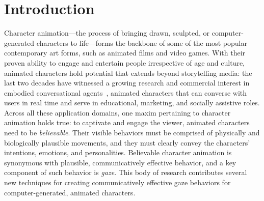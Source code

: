\pagestyle{deposit}

\chapter{Introduction}

Character animation---the process of bringing drawn, sculpted, or computer-generated characters to life---forms the backbone of some of the most popular contemporary art forms, such as animated films and video games. With their proven ability to engage and entertain people irrespective of age and culture, animated characters hold potential that extends beyond storytelling media: the last two decades have witnessed a growing research and commercial interest in embodied conversational agents~\citep{cassell2000embodied}, animated characters that can converse with users in real time and serve in educational, marketing, and socially assistive roles. Across all these application domains, one maxim pertaining to character animation holds true: to captivate and engage the viewer, animated characters need to be \emph{believable}. Their visible behaviors must be comprised of physically and biologically plausible movements, and they must clearly convey the characters' intentions, emotions, and personalities. Believable character animation is synonymous with plausible, communicatively effective behavior, and a key component of such behavior is \emph{gaze}. This body of research contributes several new techniques for creating communicatively effective gaze behaviors for computer-generated, animated characters.

